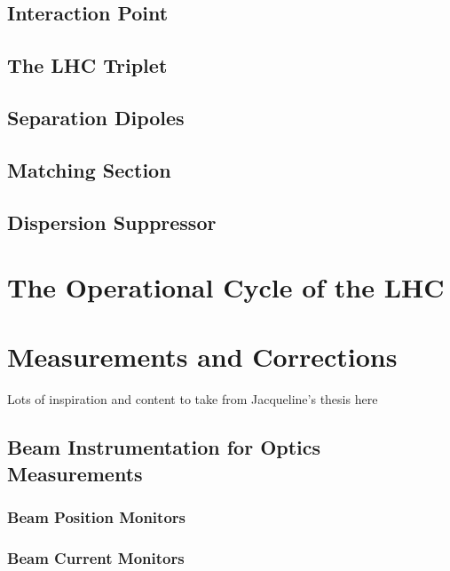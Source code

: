\subsection{Interaction Point}

\subsection{The LHC Triplet}

\subsection{Separation Dipoles}

\subsection{Matching Section}

\subsection{Dispersion Suppressor}


\section{The Operational Cycle of the LHC}


\section{Measurements and Corrections}

Lots of inspiration and content to take from Jacqueline's thesis here

\subsection{Beam Instrumentation for Optics Measurements}

\subsubsection{Beam Position Monitors}

\subsubsection{Beam Current Monitors}

